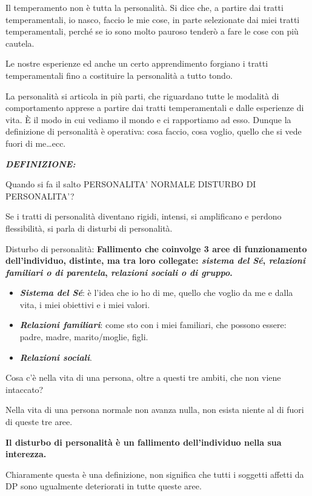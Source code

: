 \documentclass[]{article}
\begin{document}
Il temperamento non è tutta la personalità. Si dice che, a partire dai
tratti temperamentali, io nasco, faccio le mie cose, in parte
selezionate dai miei tratti temperamentali, perché se io sono molto
pauroso tenderò a fare le cose con più cautela.

Le nostre esperienze ed anche un certo apprendimento forgiano i tratti
temperamentali fino a costituire la personalità a tutto tondo.

La personalità si articola in più parti, che riguardano tutte le
modalità di comportamento apprese a partire dai tratti temperamentali e
dalle esperienze di vita. È il modo in cui vediamo il mondo e ci
rapportiamo ad esso. Dunque la definizione di personalità è operativa:
cosa faccio, cosa voglio, quello che si vede fuori di me\ldots{}ecc.

\textbf{\emph{DEFINIZIONE:}}

Quando si fa il salto PERSONALITA' NORMALE DISTURBO DI PERSONALITA'?

Se i tratti di personalità diventano rigidi, intensi, si amplificano e
perdono flessibilità, si parla di disturbi di personalità.

Disturbo di personalità: \textbf{Fallimento che coinvolge 3 aree di
funzionamento dell'individuo, distinte, ma tra loro collegate:
\emph{sistema del Sé}, \emph{relazioni familiari o di parentela},
\emph{relazioni sociali o di gruppo}.}

\begin{itemize}
\item
  \emph{\textbf{Sistema del Sé}}: è l'idea che io ho di me, quello che
  voglio da me e dalla vita, i miei obiettivi e i miei valori.
\item
  \emph{\textbf{Relazioni familiari}}: come sto con i miei familiari,
  che possono essere: padre, madre, marito/moglie, figli.
\item
  \emph{\textbf{Relazioni sociali}}.
\end{itemize}

Cosa c'è nella vita di una persona, oltre a questi tre ambiti, che non
viene intaccato?

Nella vita di una persona normale non avanza nulla, non esista niente al
di fuori di queste tre aree.

\textbf{Il disturbo di personalità è un fallimento dell'individuo nella
sua interezza.}

Chiaramente questa è una definizione, non significa che tutti i soggetti
affetti da DP sono ugualmente deteriorati in tutte queste aree.
\end{document}
